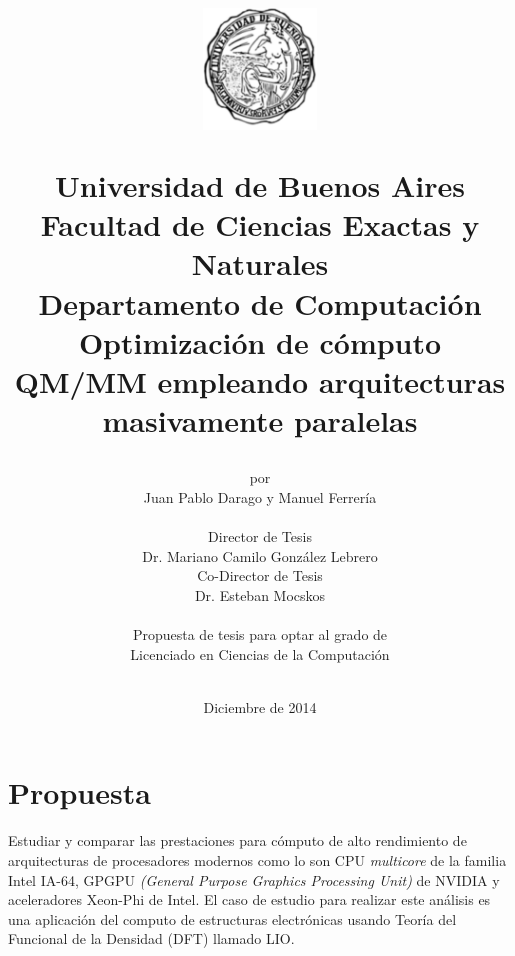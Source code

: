 \documentclass[a4paper, 12pt]{article}
\begin{document}

\title {
\begin{figure}[h]
\begin{center}
\includegraphics[keepaspectratio, width=3cm]{escudo}
\end{center}
\end{figure}
Universidad de Buenos Aires\\
Facultad de Ciencias Exactas y Naturales\\
Departamento de Computaci\'on\\
\vspace{10mm}
\Huge\textbf{Optimizaci\'on de c\'omputo QM/MM empleando arquitecturas masivamente paralelas}
\vspace{10mm}
}

\author{por \\
    Juan Pablo Darago y Manuel Ferrer\'ia\\\
        \\
        Director de Tesis\\
        Dr. Mariano Camilo Gonz\'alez Lebrero\\
        Co-Director de Tesis\\
        Dr. Esteban Mocskos\\
        \\
        Propuesta de tesis para optar al grado de \\
        Licenciado en Ciencias de la Computaci\'on\\
        \\
        }
\date{Diciembre de 2014}

\maketitle

\pagebreak

\section*{Propuesta}

Estudiar y comparar las prestaciones para c\'omputo de alto rendimiento de arquitecturas de procesadores modernos como lo son CPU \textit{multicore}
de la familia Intel IA-64, GPGPU \textit{(General Purpose Graphics Processing Unit)} de NVIDIA y aceleradores Xeon-Phi de Intel. El caso de
estudio para realizar este an\'alisis es una aplicaci\'on del computo de estructuras electr\'onicas usando Teor\'ia del Funcional de la Densidad (DFT) llamado LIO.
\end{document}
